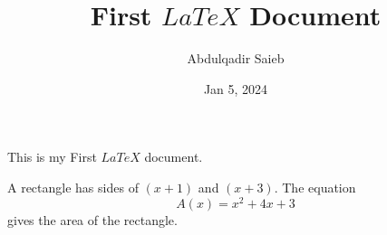 \documentclass[11pt]{article}
\title{First $LaTeX$ Document}
\author{Abdulqadir Saieb}
\date{Jan 5, 2024}
\begin{document}
\maketitle

This is my First $LaTeX$ document. 

A rectangle has sides of $(x+1)$ and $(x+3)$.
The equation $${A(x)=x^2+4x+3}$$ gives the area of the rectangle.
\end{document}
